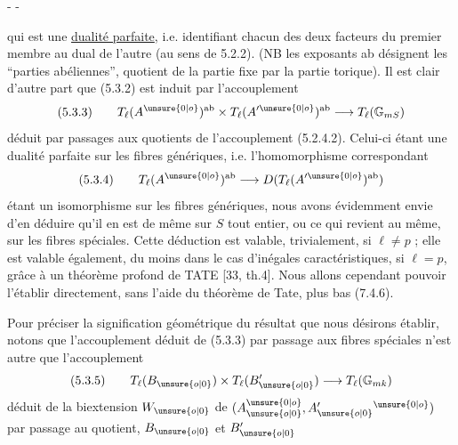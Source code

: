 \begin{center}-  -\end{center}

qui est une \uline{dualité parfaite}, i.e. identifiant chacun des deux facteurs du premier membre au dual de l'autre (au sens de 5.2.2). (NB les exposants ab désignent les ``parties abéliennes'', quotient de la partie fixe par la partie torique). Il est clair d'autre part que (5.3.2) est induit par l'accouplement
\[
(5.3.3)\qquad T_\ell(A^{\unsure{0|o}})^{\mathrm{ab}}\times T_\ell(A'^{\unsure{0|o}})^{\mathrm{ab}}\longrightarrow T_\ell(\mathbb G_{mS})
\]
déduit par passages aux quotients de l'accouplement (5.2.4.2). Celui-ci étant une dualité parfaite sur les fibres génériques, i.e. l'homomorphisme correspondant
\[
(5.3.4)\qquad T_\ell(A^{\unsure{0|o}})^{\mathrm{ab}}\longrightarrow D(T_\ell(A'^{\unsure{0|o}})^{\mathrm{ab}})
\]
étant un isomorphisme sur les fibres génériques, nous avons évidemment envie d'en déduire qu'il en est de même sur $S$ tout entier, ou ce qui revient au même, sur les fibres spéciales. Cette déduction est valable, trivialement, si $\ell\ne p$ ; elle est valable également, du moins dans le cas d'inégales caractéristiques, si $\ell=p$, grâce à un théorème profond de TATE [33, th.4]. Nous allons cependant pouvoir l'établir directement, sans l'aide du théorème de Tate, plus bas (7.4.6).

Pour préciser la signification géométrique du résultat que nous désirons établir, notons que l'accouplement déduit de (5.3.3) par passage aux fibres spéciales n'est autre que l'accouplement
\[
(5.3.5)\qquad T_\ell(B_{\unsure{o|0}})\times T_\ell(B'_{\unsure{o|0}})\longrightarrow T_\ell(\mathbb G_{mk})
\]
déduit de la biextension $W_{\unsure{o|0}}$ de $(A_{\unsure{o|0}}^{\unsure{0|o}},A'_{\unsure{o|0}}{}^{\unsure{0|o}})$ par passage au quotient, $B_{\unsure{o|0}}$ et $B'_{\unsure{o|0}}$

